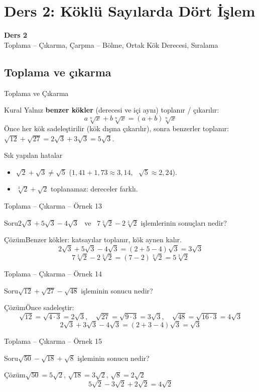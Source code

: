 \documentclass[aspectratio=169,11pt]{beamer}
\newcommand{\soru}[3]{%
\begin{frame}{#1}
  \begin{block}{Soru}\large #2\end{block}
  \pause
  \begin{exampleblock}{Çözüm}\large #3\end{exampleblock}
\end{frame}}
\begin{document}
\section{Ders 2: Köklü Sayılarda Dört İşlem}
\begin{frame}
\centering\Large\color{anamavi}\textbf{Ders 2}\\[6pt]\normalsize Toplama -- Çıkarma, Çarpma -- Bölme, Ortak Kök Derecesi, Sıralama
\end{frame}

\subsection{Toplama ve çıkarma}
\begin{frame}{Toplama ve Çıkarma}
\begin{block}{Kural}
Yalnız \textbf{benzer kökler} (derecesi ve içi aynı) toplanır / çıkarılır:
\[a\sqrt[n]{x}+b\sqrt[n]{x}=(a+b)\sqrt[n]{x}\]
Önce her kök sadeleştirilir (kök dışına çıkarılır), sonra benzerler toplanır:
\ \(\sqrt{12}+\sqrt{27}=2\sqrt3+3\sqrt3=5\sqrt3\).
\end{block}
\begin{alertblock}{Sık yapılan hatalar}
\begin{itemize}
\item \(\sqrt2+\sqrt3\neq\sqrt5\) \quad (\(1{,}41+1{,}73\approx 3{,}14\), \ \(\sqrt5\approx 2{,}24\)).
\item \(\sqrt[3]{2}+\sqrt2\) toplanamaz: dereceler farklı.
\end{itemize}
\end{alertblock}
\end{frame}

\soru{Toplama -- Çıkarma -- Örnek 13}
{\(2\sqrt3+5\sqrt3-4\sqrt3\) \ ve \ \(7\sqrt[3]{2}-2\sqrt[3]{2}\) işlemlerinin sonuçları nedir?}
{Benzer kökler: katsayılar toplanır, kök aynen kalır.
\[2\sqrt3+5\sqrt3-4\sqrt3=(2+5-4)\sqrt3=3\sqrt3\]
\[7\sqrt[3]{2}-2\sqrt[3]{2}=(7-2)\sqrt[3]{2}=5\sqrt[3]{2}\]}

\soru{Toplama -- Çıkarma -- Örnek 14}
{\(\sqrt{12}+\sqrt{27}-\sqrt{48}\) işleminin sonucu nedir?}
{Önce sadeleştir:
\[\sqrt{12}=\sqrt{4\cdot 3}=2\sqrt3,\quad \sqrt{27}=\sqrt{9\cdot 3}=3\sqrt3,\quad \sqrt{48}=\sqrt{16\cdot 3}=4\sqrt3\]
\[2\sqrt3+3\sqrt3-4\sqrt3=(2+3-4)\sqrt3=\sqrt3\]}

\soru{Toplama -- Çıkarma -- Örnek 15}
{\(\sqrt{50}-\sqrt{18}+\sqrt8\) işleminin sonucu nedir?}
{\(\sqrt{50}=5\sqrt2\), \quad \(\sqrt{18}=3\sqrt2\), \quad \(\sqrt8=2\sqrt2\)
\[5\sqrt2-3\sqrt2+2\sqrt2=4\sqrt2\]}
\end{document}
